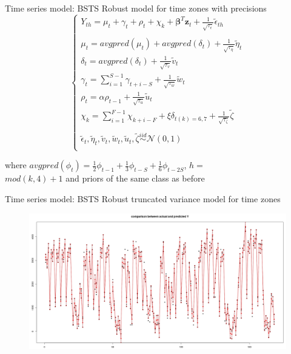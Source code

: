 \documentclass{beamer}
\begin{document}
\begin{frame}{Time series model: BSTS}
\alert{Robust model for time zones} with precisions
\begin{equation}
\begin{cases}
Y_{th} = \mu_t + \gamma_t + \rho_t + \chi_k + \boldsymbol{\beta}^T\mathbf{z}_t + \frac{1}{\sqrt{\tau_\epsilon}}\tilde{\epsilon}_{th}\\
\\
\mu_t = avgpred(\mu_t) + avgpred(\delta_t) +\frac{1}{\sqrt{\tau_\eta}}\tilde{\eta}_t\\
\delta_t = avgpred(\delta_t) + \frac{1}{\sqrt{\tau_v}}\tilde{v}_t\\
\gamma_t = \sum_{i=1}^{S-1}\gamma_{t+i-S} + \frac{1}{\sqrt{\tau_w}}\tilde{w}_t\\
\rho_t = \alpha\rho_{t-1} + \frac{1}{\sqrt{\tau_u}}\tilde{u}_t\\
\chi_k = \sum_{i=1}^{F-1}\chi_{k+i-F} + \xi\delta_{t(k)=6,7} + \frac{1}{\sqrt{\tau_\zeta}}\tilde{\zeta}\\
\\
\tilde{\epsilon}_t, \tilde{\eta}_t, \tilde{v}_t, \tilde{w}_t, \tilde{u}_t, \tilde{\zeta} \overset{iid}{\sim} \mathcal{N}(0,1)\\
\end{cases}
\end{equation}

where  $ avgpred(\phi_t) =\frac{1}{2}\phi_{t-1} + \frac{1}{3}\phi_{t-S} + \frac{1}{6} \phi_{t-2S}$, $ h=$\\$mod(k,4)+1 $
and \alert{priors of the same class as before}
\end{frame}

\begin{frame}{Time series model: BSTS}
Robust truncated variance model for time zones
\begin{figure}[H]
	\centering
	\includegraphics[width=1\linewidth]{pictures/multiple.png} 
	\label{fig5}
\end{figure}

\end{frame}
\end{document}
